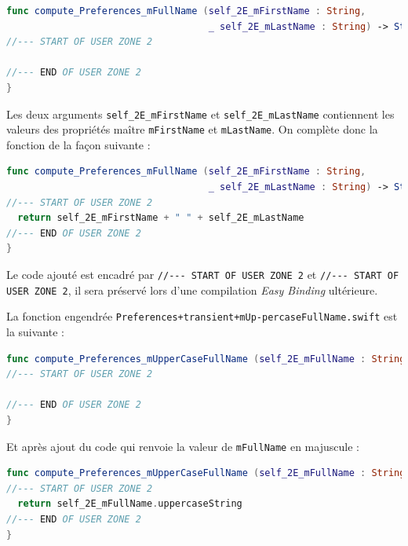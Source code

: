 \begin{lstlisting}[language=swift]
func compute_Preferences_mFullName (self_2E_mFirstName : String,
                                    _ self_2E_mLastName : String) -> String {
//--- START OF USER ZONE 2

//--- END OF USER ZONE 2
}
\end{lstlisting}

Les deux arguments \texttt{self\_2E\_mFirstName} et \texttt{self\_2E\_mLastName} contiennent les valeurs des propriétés maître \texttt{mFirstName} et \texttt{mLastName}. On complète donc la fonction de la façon suivante :
\begin{lstlisting}[language=swift]
func compute_Preferences_mFullName (self_2E_mFirstName : String,
                                    _ self_2E_mLastName : String) -> String {
//--- START OF USER ZONE 2
  return self_2E_mFirstName + " " + self_2E_mLastName
//--- END OF USER ZONE 2
}
\end{lstlisting}

Le code ajouté est encadré par \texttt{//-{}-{}- START OF USER ZONE 2} et \texttt{//-{}-{}- START OF USER ZONE 2}, il sera préservé lors d'une compilation \emph{Easy Binding} ultérieure.








La fonction engendrée \texttt{Preferences+transient+mUp-percaseFullName.swift} est la suivante :


\begin{lstlisting}[language=swift]
func compute_Preferences_mUpperCaseFullName (self_2E_mFullName : String) -> String {
//--- START OF USER ZONE 2

//--- END OF USER ZONE 2
}
\end{lstlisting}

Et après ajout du code qui renvoie la valeur de \texttt{mFullName} en majuscule :
\begin{lstlisting}[language=swift]
func compute_Preferences_mUpperCaseFullName (self_2E_mFullName : String) -> String {
//--- START OF USER ZONE 2
  return self_2E_mFullName.uppercaseString
//--- END OF USER ZONE 2
}
\end{lstlisting}









